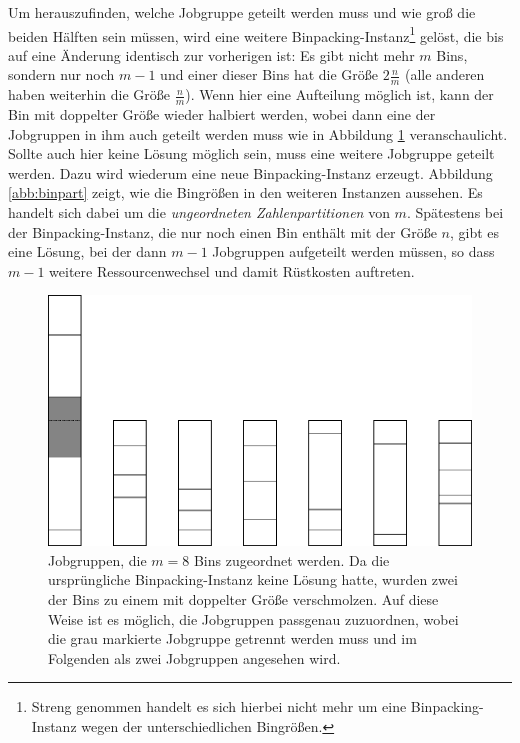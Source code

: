 \documentclass{scrreprt}
\begin{document}
Um herauszufinden, welche Jobgruppe geteilt werden muss und wie groß die beiden Hälften sein müssen,
wird eine weitere Binpacking-Instanz\footnote{Streng genommen handelt es sich hierbei nicht mehr um eine Binpacking-Instanz wegen der unterschiedlichen Bingrößen.} 
gelöst, die bis auf eine Änderung identisch zur vorherigen ist:
Es gibt nicht mehr $m$ Bins, sondern nur noch $m-1$ und einer dieser Bins hat die Größe $2\frac{n}{m}$ (alle anderen haben weiterhin die Größe $\frac{n}{m}$).
Wenn hier eine Aufteilung möglich ist, kann der Bin mit doppelter Größe wieder halbiert werden,
wobei dann eine der Jobgruppen in ihm auch geteilt werden muss wie in Abbildung \ref{abb:2binbsp} veranschaulicht.
Sollte auch hier keine Lösung möglich sein, muss eine weitere Jobgruppe geteilt werden.
Dazu wird wiederum eine neue Binpacking-Instanz erzeugt.
Abbildung \ref{abb:binpart} zeigt, wie die Bingrößen in den weiteren Instanzen aussehen.
Es handelt sich dabei um die \textit{ungeordneten Zahlenpartitionen} von $m$.
Spätestens bei der Binpacking-Instanz, die nur noch einen Bin enthält mit der Größe $n$, gibt es eine Lösung,
bei der dann $m-1$ Jobgruppen aufgeteilt werden müssen, so dass $m-1$ weitere Ressourcenwechsel und damit Rüstkosten auftreten.
\begin{figure}
    \begin{center}
        \includegraphics[width=.6\textwidth]{graphics/2binbsp.pdf}
    \end{center}
    \caption{
        \label{abb:2binbsp}
        Jobgruppen, die $m=8$ Bins zugeordnet werden.
        Da die ursprüngliche Binpacking-Instanz keine Lösung hatte, wurden zwei der Bins zu einem mit doppelter Größe verschmolzen.
        Auf diese Weise ist es möglich, die Jobgruppen passgenau zuzuordnen, wobei die grau markierte Jobgruppe
        getrennt werden muss und im Folgenden als zwei Jobgruppen angesehen wird.
    }
\end{figure}
\end{document}
